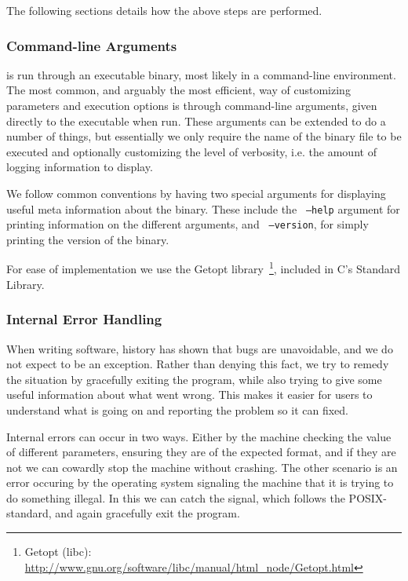 The following sections details how the above steps are performed.

\subsubsection{Command-line Arguments}
\thename{} is run through an executable binary, most likely in a command-line
environment. The most common, and arguably the most efficient, way of
customizing parameters and execution options is through command-line arguments,
given directly to the executable when run. These arguments can be extended to do
a number of things, but essentially we only require the name of the binary file
to be executed and optionally customizing the level of verbosity, i.e. the
amount of logging information to display. %

We follow common conventions by having two special arguments for displaying
useful meta information about the \thename{} binary. These include the {\tt
  --help} argument for printing information on the different arguments, and {\tt
  --version}, for simply printing the version of the binary.

For ease of implementation we use the Getopt library~\footnote{Getopt (libc):
  \url{http://www.gnu.org/software/libc/manual/html_node/Getopt.html}}, included
in C's Standard Library.


\subsubsection{Internal Error Handling}

When writing software, history has shown that bugs are unavoidable, and we do
not expect \thename{} to be an exception. Rather than denying this fact, we try
to remedy the situation by gracefully exiting the program, while also trying to
give some useful information about what went wrong. This makes it easier for
users to understand what is going on and reporting the problem so it can fixed.

Internal errors can occur in two ways. Either by the machine checking the value
of different parameters, ensuring they are of the expected format, and if they
are not we can cowardly stop the machine without crashing. The other scenario is
an error occuring by the operating system signaling the machine that it is
trying to do something illegal. In this we can catch the signal, which follows
the POSIX-standard, and again gracefully exit the program.

